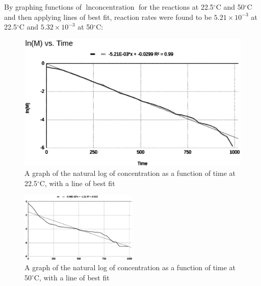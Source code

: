 \documentclass[12pt]{article}
\begin{document}
	By graphing functions of $\ln{\text{concentration}}$ for the reactions at 22.5$^\circ$C and 50$^\circ$C and then applying lines of best fit, reaction rates were found to be $5.21 \times 10^{-3}$ at 22.5$^\circ$C and $5.32 \times 10^{-3}$ at 50$^\circ$C:
	\begin{figure}[H]
		\centerline{\includegraphics[width=.5\textwidth]{images/lnMvstime225.EPS}}
		\caption{A graph of the natural log of concentration as a function of time at 22.5$^\circ$C, with a line of best fit}
	\end{figure}
	\begin{figure}[H]
		\centerline{\includegraphics[width=0.5\textwidth]{images/lnmvstime50.EPS}}
		\caption{A graph of the natural log of concentration as a function of time at 50$^\circ$C, with a line of best fit}
	\end{figure}
	
\end{document}
